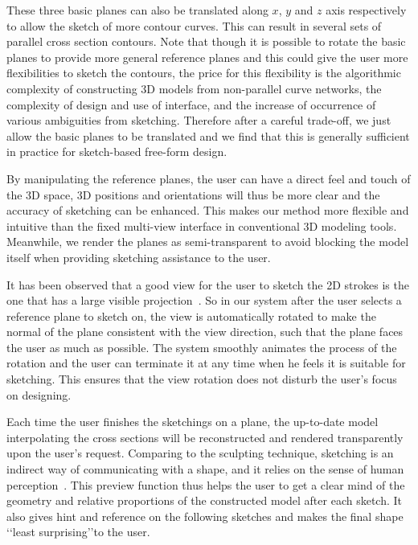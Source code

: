 These three basic planes can also be translated along $x$, $y$ and $z$ axis respectively to allow the sketch of more contour curves. This can result in several sets of parallel cross section contours. Note that though it is possible to rotate the basic planes to provide more general reference planes and this could give the user more flexibilities to sketch the contours, the price for this flexibility is the algorithmic complexity of constructing 3D models from non-parallel curve networks, the complexity of design and use of interface, and the increase of occurrence of various ambiguities from sketching. Therefore after a careful trade-off, we just allow the basic planes to be translated and we find that this is generally sufficient in practice for sketch-based free-form design.

By manipulating the reference planes, the user can have a direct feel and touch of the 3D space, 3D positions and orientations will thus be more clear and the accuracy of sketching can be enhanced. This makes our method more flexible and intuitive than the fixed multi-view interface in conventional 3D modeling tools. Meanwhile, we render the planes as semi-transparent to avoid blocking the model itself when providing sketching assistance to the user.

It has been observed that a good view for the user to sketch the 2D strokes is the one that has a large visible projection~\cite{BBS08}. So in our system after the user selects a reference plane to sketch on, the view is automatically rotated to make the normal of the plane consistent with the view direction, such that the plane faces the user as much as possible. The system smoothly animates the process of the rotation and the user can terminate it at any time when he feels it is suitable for sketching. This ensures that the view rotation does not disturb the user's focus on designing.

Each time the user finishes the sketchings on a plane, the up-to-date model interpolating the cross sections will be reconstructed and rendered transparently upon the user's request. Comparing to the sculpting technique, sketching is an indirect way of communicating with a shape, and it relies on the sense of human perception~\cite{CIW08}. This preview function thus helps the user to get a clear mind of the geometry and relative proportions of the constructed model after each sketch.  It also gives hint and reference on the following sketches and makes the final shape \lq\lq{least surprising}\rq\rq to the user. 

